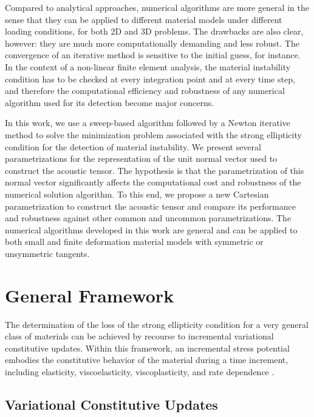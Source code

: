 \documentclass[12pt]{article}
\numberwithin{equation}{section}
\begin{document}
Compared to analytical approaches, numerical algorithms are more
general in the sense that they can be applied to different material
models under different loading conditions, for both 2D and 3D
problems. The drawbacks are also clear, however: they are much more
computationally demanding and less robust. The convergence of an
iterative method is sensitive to the initial guess, for instance. In
the context of a non-linear finite element analysis, the material
instability condition has to be checked at every integration point and
at every time step, and therefore the computational efficiency and
robustness of any numerical algorithm used for its detection become
major concerns.

In this work, we use a sweep-based algorithm followed by a Newton
iterative method to solve the minimization problem associated with the
strong ellipticity condition for the detection of material
instability. We present several parametrizations for the
representation of the unit normal vector used to construct the
acoustic tensor. The hypothesis is that the parametrization of this
normal vector significantly affects the computational cost and
robustness of the numerical solution algorithm. To this end, we
propose a new Cartesian parametrization to construct the acoustic
tensor and compare its performance and robustness against other common
and uncommon parametrizations. The numerical algorithms developed in
this work are general and can be applied to both small and finite
deformation material models with symmetric or unsymmetric tangents.

\section{General Framework}

The determination of the loss of the strong ellipticity condition for
a very general class of materials can be achieved by recourse to
incremental variational constitutive updates. Within this framework,
an incremental stress potential embodies the constitutive behavior of
the material during a time increment, including elasticity,
viscoelasticity, viscoplasticity, and rate dependence
\citep{Ortiz.Stainier:1999, Lambrecht.etal:2003,
  Miehe.etal:2004, Weinberg.etal:2006,
  Fancello.etal:2006, Mosler.Bruhns:2010,
  Bleier.Mosler:2012}.

\subsection{Variational Constitutive Updates}
\end{document}

